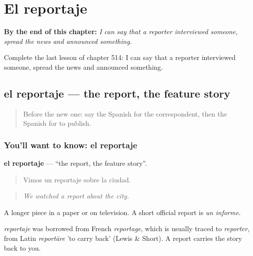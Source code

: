 
\chapter{El reportaje}
\label{ch:es-el-reportaje}

\begin{chapteropening}
\textbf{By the end of this chapter:} \emph{I can say that a reporter interviewed someone, spread the news and announced something.}

Complete the last lesson of chapter 514: I can say that a reporter interviewed someone, spread the news and announced something.
\end{chapteropening}

\section[el reportaje]{el reportaje — the report, the feature story}

\label{lesson:ES-C514-reportaje}



\begin{quote}
Before the new one: say the Spanish for the correspondent, then the Spanish for to publish.
\end{quote}

\subsection*{You'll want to know: el reportaje}
\textbf{el reportaje} — \textquotedblleft{}the report, the feature story\textquotedblright{}.

\begin{quote}
Vimos un reportaje sobre la ciudad.
\end{quote}

\begin{quote}
\emph{We watched a report about the city.}
\end{quote}

A longer piece in a paper or on television. A short official report is \emph{un informe}.

\begin{cousinweb}
\emph{reportaje} was borrowed from French \emph{reportage}, which is usually traced to \emph{reporter}, from Latin \emph{reportāre} 'to carry back' (Lewis \& Short). A report carries the story back to you.
\end{cousinweb}

